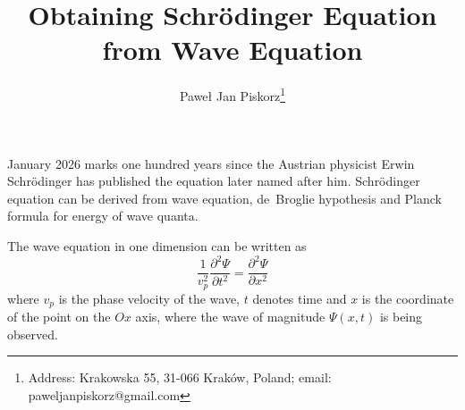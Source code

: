 \documentclass[12pt,a4paper,pl,fleqn]{article}
\title{Obtaining Schrödinger Equation from Wave Equation}
\author{Paweł Jan Piskorz\footnote{Address: Krakowska 55, 31-066 Kraków, Poland; email: paweljanpiskorz@gmail.com}}
\date{}
\begin{document}
\maketitle





January 2026 marks one hundred years since the Austrian physicist Erwin Schrödinger has published the equation later named after him.
Schrödinger equation can be derived from wave equation, de~Broglie hypothesis and Planck formula for energy of wave quanta.


The wave equation in one dimension can be written as
\begin{equation}
\frac{1}{v_{p}^{2}} \frac{\partial^{2} \Psi}{\partial t^{2}} = \frac{\partial^{2} \Psi}{\partial x^{2}}
\end{equation}
where $v_{p}$ is the phase velocity of the wave, $t$ denotes time and $x$ is the coordinate of the point on the $Ox$ axis, where the wave of
magnitude $\Psi(x, t)$ is being observed.
\end{document}
